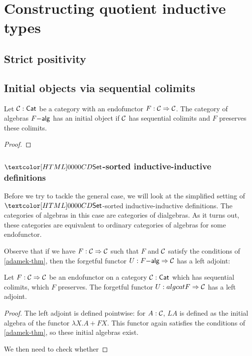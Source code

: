 \chapter{Constructing quotient inductive types}

\section{Strict positivity}



\section{Initial objects via sequential colimits}


\begin{theorem}[Ad\'amek]
  \label{adamek-thm}
  Let $\mathcal{C} : \mathsf{Cat}$ be a category with an endofunctor
  $F : \mathcal{C} \Rightarrow \mathcal{C}$. The category of algebras $F\mathsf{-alg}$ has an
  initial object if $\mathcal{C}$ has sequential colimits and $F$ preserves
  these colimits.
\end{theorem}

\begin{proof}
  
\end{proof}

\subsection{$\Set$-sorted inductive-inductive definitions}

Before we try to tackle the general case, we will look at the
simplified setting of $\Set$-sorted inductive-inductive
definitions. The categories of algebras in this case are categories of
dialgebras. As it turns out, these categories are equivalent to
ordinary categories of algebras for some endofunctor.

Observe that if we have $F : \mathcal{C} \Rightarrow \mathcal{C}$ such that $F$ and $\mathcal{C}$
satisfy the conditions of \cref{adamek-thm}, then the forgetful
functor $U : F\mathsf{-alg} \Rightarrow \mathcal{C}$ has a left adjoint:

\begin{proposition}
  Let $F : \mathcal{C} \Rightarrow \mathcal{C}$ be an endofunctor on a category
  $\mathcal{C} : \mathsf{Cat}$ which has sequential colimits, which $F$ preserves. The
  forgetful functor $U : algcat{F} \Rightarrow \mathcal{C}$ has a left adjoint.
\end{proposition}

\begin{proof}
  The left adjoint is defined pointwise: for $A : \mathcal{C}$, $L A$ is
  defined as the initial algebra of the functor $\lambda X . A + FX$.
  This functor again satisfies the conditions of \cref{adamek-thm}, so
  these initial algebras exist.

  We then need to check whether 
  
  
\end{proof}

